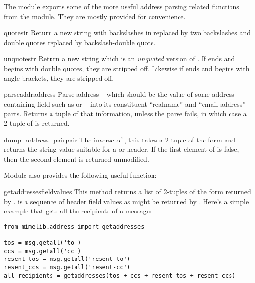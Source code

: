 \documentclass{howto}
\begin{document}
The  module exports some of the more useful
address parsing related functions from the  module.
They are mostly provided for convenience.

\begin{funcdesc}{quote}{str}
Return a new string with backslashes in  replaced by two
backslashes and double quotes replaced by backslash-double quote.
\end{funcdesc}

\begin{funcdesc}{unquote}{str}
Return a new string which is an \emph{unquoted} version of .
If  ends and begins with double quotes, they are stripped
off.  Likewise if  ends and begins with angle brackets, they
are stripped off.
\end{funcdesc}

\begin{funcdesc}{parseaddr}{address}
Parse address -- which should be the value of some address-containing
field such as  or  -- into its constituent
``realname'' and ``email address'' parts.  Returns a tuple of that
information, unless the parse fails, in which case a 2-tuple of
 is returned.
\end{funcdesc}

\begin{funcdesc}{dump_address_pair}{pair}
The inverse of , this takes a 2-tuple of the form
 and returns the string value suitable
for a  or  header.  If the first element of
 is false, then the second element is returned unmodified.
\end{funcdesc}

Module  also provides the following useful function:

\begin{funcdesc}{getaddresses}{fieldvalues}
This method returns a list of 2-tuples of the form returned by
.   is a sequence of header field
values as might be returned by .  Here's a
simple example that gets all the recipients of a message:

\begin{verbatim}
from mimelib.address import getaddresses

tos = msg.getall('to')
ccs = msg.getall('cc')
resent_tos = msg.getall('resent-to')
resent_ccs = msg.getall('resent-cc')
all_recipients = getaddresses(tos + ccs + resent_tos + resent_ccs)
\end{verbatim}
\end{funcdesc}
\end{document}
